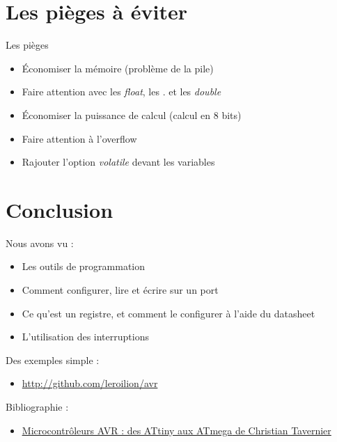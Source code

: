 \documentclass{beamer}
\begin{document}
\section{Les pi\`eges \`a \'eviter}

\begin{frame}
  \begin{alertblock}{Les pi\`eges}
    \pause
    \begin{itemize}
     \item \'Economiser la m\'emoire (probl\`eme de la pile)
     \pause 
     \item Faire attention avec les \emph{float}, les . et les \emph{double}
     \pause
     \item \'Economiser la puissance de calcul (calcul en 8 bits)
     \pause
     \item Faire attention \`a l'overflow
     \pause
     \item Rajouter l'option \emph{volatile} devant les variables
    \end{itemize}

  \end{alertblock}
\end{frame}


\section*{Conclusion}

\begin{frame}
  Nous avons vu :\\
  \begin{itemize}
    \pause
    \item Les outils de programmation
    \pause
    \item Comment configurer, lire et \'ecrire sur un port
    \pause
    \item Ce qu'est un registre, et comment le configurer \`a l'aide du datasheet
    \pause
    \item L'utilisation des interruptions
  \end{itemize}
  \pause 
  Des exemples simple :\\
   \begin{itemize}
    \pause
    \item \hyperlink{http://github.com/leroilion/avr}{http://github.com/leroilion/avr}
   \end{itemize}
  Bibliographie :\\
    \begin{itemize}
      \pause
      \item \hyperlink{http://www.tavernier-c.com/livres.htm}{\underline{Microcontr\^oleurs AVR : des ATtiny aux ATmega} de Christian Tavernier }
    \end{itemize}

\end{frame}
\end{document}
